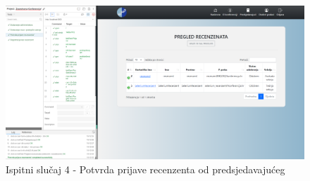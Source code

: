 			   \begin{figure}[H]
			 	\includegraphics[width= 15 cm, height= 25 cm, keepaspectratio]{slike/test_potvrda_prijave_recenzenta.png} 
			 	\centering
			 	\caption{Ispitni slučaj 4 - Potvrda prijave recenzenta od predsjedavajućeg}
			 	\label{fig:act5}
			 \end{figure}
		

